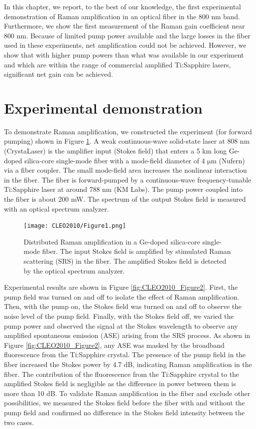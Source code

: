 In this chapter, we report, to the best of our knowledge, the first experimental demonstration of Raman amplification in an optical fiber in the 800 nm band. Furthermore, we show the first measurement of the Raman gain coefficient near 800 nm. Because of limited pump power available and the large losses in the fiber used in these experiments, net amplification could not be achieved. However, we show that with higher pump powers than what was available in our experiment and which are within the range of commercial amplified Ti:Sapphire lasers, significant net gain can be achieved. 

\section{Experimental demonstration}

To demonstrate Raman amplification, we constructed the experiment (for forward pumping) shown in Figure \ref{fig:CLEO2010_Figure1}. A weak continuous-wave solid-state laser at 808 nm (CrystaLaser) is the amplifier input (Stokes field) that enters a 5 km long Ge-doped silica-core single-mode fiber with a mode-field diameter of 4 $\mathrm{\mu}$m (Nufern) via a fiber coupler. The small mode-field area increases the nonlinear interaction in the fiber. The fiber is forward-pumped by a continuous-wave frequency-tunable Ti:Sapphire laser at around 788 nm (KM Labs). The pump power coupled into the fiber is about 200 mW. The spectrum of the output Stokes field is measured with an optical spectrum analyzer. 

\begin{figure}[htb!]
\centering
\texttt{[image: CLEO2010/Figure1.png]}
\caption{Distributed Raman amplification in a Ge-doped silica-core single-mode fiber. The input Stokes field is amplified by stimulated Raman scattering (SRS) in the fiber. The amplified Stokes field is detected by the optical spectrum analyzer.}
\label{fig:CLEO2010_Figure1}
\end{figure}

Experimental results are shown in Figure \ref{fig:CLEO2010_Figure2}. First, the pump field was turned on and off to isolate the effect of Raman amplification. Then, with the pump on, the Stokes field was turned on and off to observe the noise level of the pump field. Finally, with the Stokes field off, we varied the pump power and observed the signal at the Stokes wavelength to observe any amplified spontaneous emission (ASE) arising from the SRS process. As shown in Figure \ref{fig:CLEO2010_Figure2}, any ASE was masked by the broadband fluorescence from the Ti:Sapphire crystal. The presence of the pump field in the fiber increased the Stokes power by 4.7 dB, indicating Raman amplification in the fiber. The contribution of the fluorescence from the Ti:Sapphire crystal to the amplified Stokes field is negligible as the difference in power between them is more than 10 dB. To validate Raman amplification in the fiber and exclude other possibilities, we measured the Stokes field before the fiber with and without the pump field and confirmed no difference in the Stokes field intensity between the two cases. 

